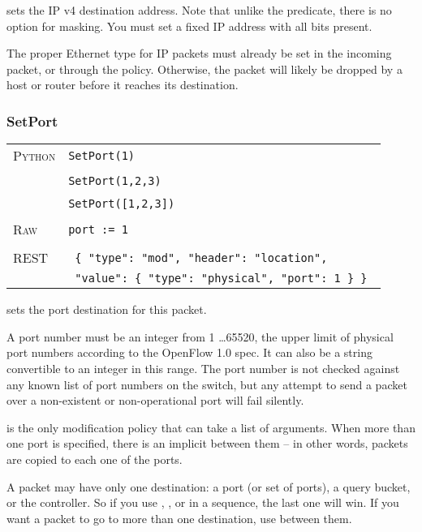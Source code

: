 sets the IP v4 destination address.  Note that unlike the  predicate,
there is no option for masking.  You must set a fixed IP address with all bits present.    

The proper Ethernet type for IP packets must already be set in the incoming packet, or through the 
 policy.  Otherwise, the packet will likely be dropped by a host or router before it 
reaches its destination.

\subsubsection{SetPort}

\bigskip
\begin{tabularx}{\linewidth}{lX}
\textsc{Python}   & \texttt{SetPort(1)} \\ \\
   & \texttt{SetPort(1,2,3)} \\ \\
   & \texttt{SetPort([1,2,3])} \\ \\
\textsc{Raw}    & \texttt{port := 1}     \\ \\
\textsc{REST} & \texttt{ \{ "type": "mod", "header": "location", } \\
 & \texttt{ "value": \{ "type": "physical", "port": 1 \} \} } 
\end{tabularx}

 sets the port destination for this packet.      

A port number must be an integer from
1 \ldots 65520, the upper limit of physical port numbers according to the OpenFlow 1.0 spec.  It can also be 
a string convertible to an integer in this range.  The port number is not checked against any known list
of port numbers on the switch, but any attempt to send a packet over a non-existent or non-operational
port will fail silently.

 is the only modification policy that can take a list of arguments.  When more than one
port is specified, there is an implicit  between them -- in other words, packets are copied
to each one of the ports.  

A packet may have only one destination: a port (or set of ports), a query bucket, or the controller.  So if you use 
, , or  in a sequence, the last one will
win.  If you want a packet to go to more than one destination, use  between them.    

